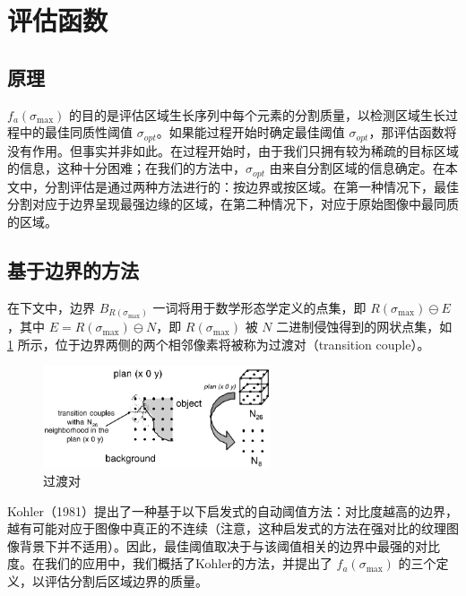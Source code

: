 \section{评估函数}\label{sec:assessment_function}

\subsection{原理}

$f_{a}(\sigma_{\text{max}})$ 的目的是评估区域生长序列中每个元素的分割质量，以检测区域生长过程中的最佳同质性阈值 $\sigma_{opt}$。如果能过程开始时确定最佳阈值 $\sigma_{opt}$，那评估函数将没有作用。但事实并非如此。在过程开始时，由于我们只拥有较为稀疏的目标区域的信息，这种十分困难；在我们的方法中，$\sigma_{opt}$ 由来自分割区域的信息确定。在本文中，分割评估是通过两种方法进行的：按边界或按区域。在第一种情况下，最佳分割对应于边界呈现最强边缘的区域，在第二种情况下，对应于原始图像中最同质的区域。

\subsection{基于边界的方法}

在下文中，边界 $B_{R(\sigma_{\text{max}})}$ 一词将用于数学形态学定义的点集，即 $R(\sigma_{\text{max}}) \ominus E$，其中 $E = R(\sigma_{\text{max}}) \ominus N$，即 $R(\sigma_{\text{max}})$ 被 $N$ 二进制侵蚀得到的网状点集，如 \cref{fig:过渡对} 所示，位于边界两侧的两个相邻像素将被称为过渡对（transition couple）。

\begin{figure}[htbp]
    \centering
    \includegraphics[width=0.6\textwidth]{figures/过渡对.png}
    \caption{过渡对}
    \label{fig:过渡对}
\end{figure}

Kohler（1981）\cite{kohler1981segmentation}提出了一种基于以下启发式的自动阈值方法：对比度越高的边界，越有可能对应于图像中真正的不连续（注意，这种启发式的方法在强对比的纹理图像背景下并不适用）。因此，最佳阈值取决于与该阈值相关的边界中最强的对比度。在我们的应用中，我们概括了Kohler的方法，并提出了 $f_{a}(\sigma_{\text{max}})$ 的三个定义，以评估分割后区域边界的质量。

